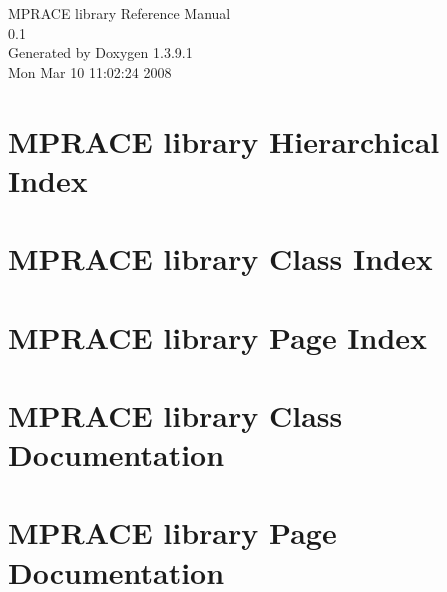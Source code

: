\documentclass[a4paper]{book}
\begin{document}
\begin{titlepage}
\vspace*{7cm}
\begin{center}
{\Large MPRACE library Reference Manual\\[1ex]\large 0.1 }\\
\vspace*{1cm}
{\large Generated by Doxygen 1.3.9.1}\\
\vspace*{0.5cm}
{\small Mon Mar 10 11:02:24 2008}\\
\end{center}
\end{titlepage}
\clearemptydoublepage
{}
\tableofcontents
\clearemptydoublepage
{}
\chapter{MPRACE library Hierarchical Index}

\chapter{MPRACE library Class Index}

\chapter{MPRACE library Page Index}

\chapter{MPRACE library Class Documentation}





















\chapter{MPRACE library Page Documentation}

\printindex
\end{document}
